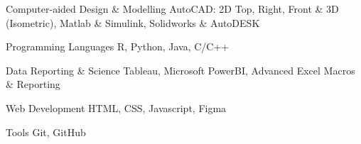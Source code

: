 

\begin{cvskills}

 \cvskill
    {Computer-aided Design \& Modelling} %
    {AutoCAD: 2D Top, Right, Front \& 3D (Isometric), Matlab \& Simulink, Solidworks \& AutoDESK } %


  \cvskill
    {Programming Languages} %
    {R, Python, Java, C/C++} %






  \cvskill
    {Data Reporting \& Science} %
    {Tableau, Microsoft PowerBI, Advanced Excel Macros \& Reporting} %





  \cvskill
    {Web Development} %
    {HTML, CSS, Javascript, Figma} %


  \cvskill
    {Tools} %
    {Git, GitHub} %


    



    



    

\end{cvskills}
